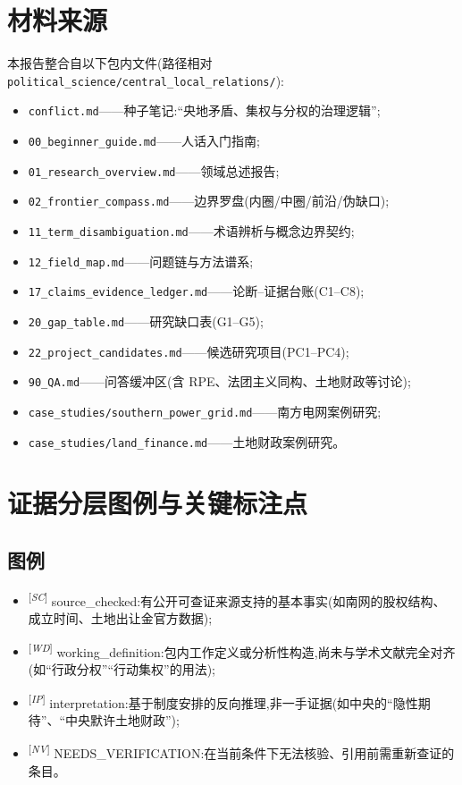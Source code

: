 \documentclass[UTF8,12pt,a4paper]{ctexrep}
\newcommand{\src}[1]{\textsuperscript{[\emph{#1}]}}
\begin{document}
\appendix

\chapter{材料来源}

本报告整合自以下包内文件(路径相对 \texttt{political\_science/central\_local\_relations/}):

\begin{itemize}
  \item \texttt{conflict.md}——种子笔记:``央地矛盾、集权与分权的治理逻辑'';
  \item \texttt{00\_beginner\_guide.md}——人话入门指南;
  \item \texttt{01\_research\_overview.md}——领域总述报告;
  \item \texttt{02\_frontier\_compass.md}——边界罗盘(内圈/中圈/前沿/伪缺口);
  \item \texttt{11\_term\_disambiguation.md}——术语辨析与概念边界契约;
  \item \texttt{12\_field\_map.md}——问题链与方法谱系;
  \item \texttt{17\_claims\_evidence\_ledger.md}——论断--证据台账(C1--C8);
  \item \texttt{20\_gap\_table.md}——研究缺口表(G1--G5);
  \item \texttt{22\_project\_candidates.md}——候选研究项目(PC1--PC4);
  \item \texttt{90\_QA.md}——问答缓冲区(含 RPE、法团主义同构、土地财政等讨论);
  \item \texttt{case\_studies/southern\_power\_grid.md}——南方电网案例研究;
  \item \texttt{case\_studies/land\_finance.md}——土地财政案例研究。
\end{itemize}

\chapter{证据分层图例与关键标注点}

\section{图例}

\begin{itemize}
  \item \src{SC} source\_checked:有公开可查证来源支持的基本事实(如南网的股权结构、成立时间、土地出让金官方数据);
  \item \src{WD} working\_definition:包内工作定义或分析性构造,尚未与学术文献完全对齐(如``行政分权''``行动集权''的用法);
  \item \src{IP} interpretation:基于制度安排的反向推理,非一手证据(如中央的``隐性期待''、``中央默许土地财政'');
  \item \src{NV} NEEDS\_VERIFICATION:在当前条件下无法核验、引用前需重新查证的条目。
\end{itemize}
\end{document}

